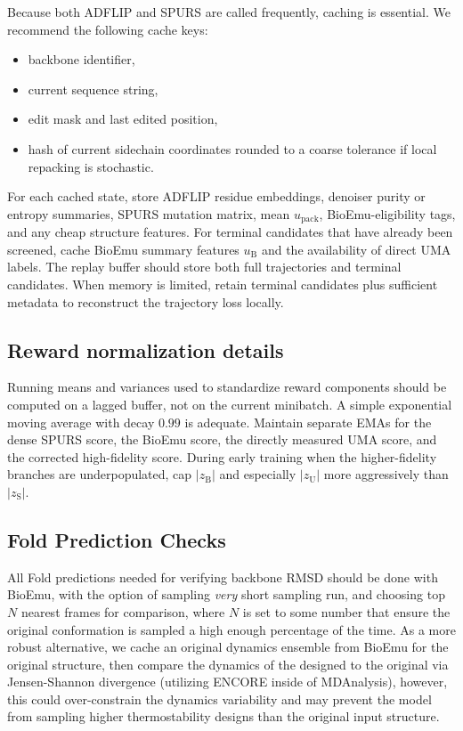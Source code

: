 \documentclass[11pt]{article}
\newcommand{\packunc}{\ensuremath{u_{\mathrm{pack}}}}
\begin{document}
	Because both ADFLIP and SPURS are called frequently, caching is essential. We recommend the following cache keys:
	\begin{itemize}[leftmargin=1.5em]
		\item backbone identifier,
		\item current sequence string,
		\item edit mask and last edited position,
		\item hash of current sidechain coordinates rounded to a coarse tolerance if local repacking is stochastic.
	\end{itemize}
	For each cached state, store ADFLIP residue embeddings, denoiser purity or entropy summaries, SPURS mutation matrix, mean \packunc, BioEmu-eligibility tags, and any cheap structure features. For terminal candidates that have already been screened, cache BioEmu summary features $u_{\mathrm B}$ and the availability of direct UMA labels. The replay buffer should store both full trajectories and terminal candidates. When memory is limited, retain terminal candidates plus sufficient metadata to reconstruct the trajectory loss locally.
	
	\subsection{Reward normalization details}
	
	Running means and variances used to standardize reward components should be computed on a lagged buffer, not on the current minibatch. A simple exponential moving average with decay $0.99$ is adequate. Maintain separate EMAs for the dense SPURS score, the BioEmu score, the directly measured UMA score, and the corrected high-fidelity score. During early training when the higher-fidelity branches are underpopulated, cap $|z_{\mathrm B}|$ and especially $|z_{\mathrm U}|$ more aggressively than $|z_{\mathrm S}|$.
	
	\subsection{Fold Prediction Checks}
	All Fold predictions needed for verifying backbone RMSD should be done with BioEmu, with the option of sampling \emph{very} short sampling run, and choosing top $N$ nearest frames for comparison, where $N$ is set to some number that ensure the original conformation is sampled a high enough percentage of the time. As a more robust alternative, we cache an original dynamics ensemble from BioEmu for the original structure, then compare the dynamics of the designed to the original via Jensen-Shannon divergence (utilizing ENCORE inside of MDAnalysis), however, this could over-constrain the dynamics variability and may prevent the model from sampling higher thermostability designs than the original input structure. 
	
\end{document}
